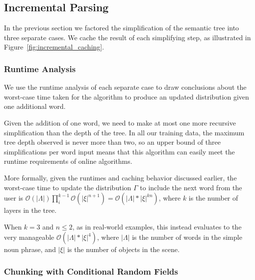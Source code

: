 \documentclass[conference]{IEEEtran}
\numberwithin{equation}{section}
\begin{document}
\subsection{Incremental Parsing}

In the previous section we factored the simplification of the semantic tree into three separate cases. We cache the result of each simplifying step, as illustrated in Figure~\ref{fig:incremental_caching}.


\subsubsection{Runtime Analysis}

We use the runtime analysis of each separate case to draw conclusions about the worst-case time taken for the algorithm to produce an updated distribution given one additional word.

Given the addition of one word, we need to make at most one more recursive simplification than the depth of the tree. In all our training data, the maximum tree depth observed is never more than two, so an upper bound of three simplifications per word input means that this algorithm can easily meet the runtime requirements of online algorithms.

More formally, given the runtimes and caching behavior discussed earlier, the worst-case time to update the distribution $\Gamma$ to include the next word from the user is $\mathcal{O}(|\Lambda|) \prod_i^{k-1} \mathcal{O}(|\xi|^{n+1}) = \mathcal{O}(|\Lambda| * |\xi|^{kn})$, where $k$ is the number of layers in the tree.

When $k = 3$ and $n \leq 2$, as in real-world examples, this instead evaluates to the very manageable $\mathcal{O}(|\Lambda| * |\xi|^{4})$, where $|\Lambda|$ is the number of words in the simple noun phrase, and $|\xi|$ is the number of objects in the scene.

\subsubsection{Chunking with Conditional Random Fields}
\end{document}
